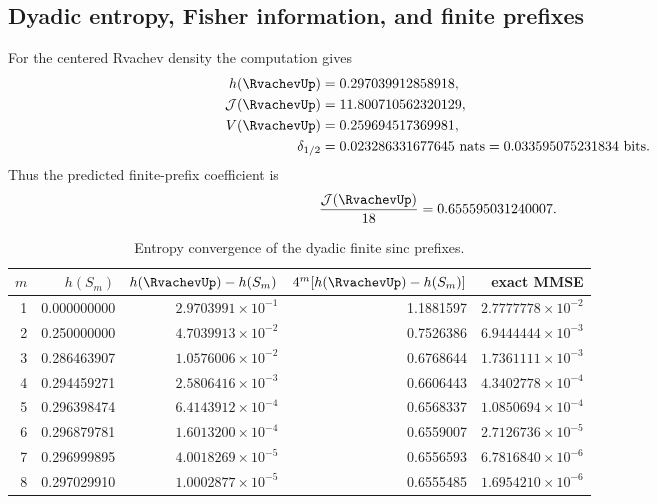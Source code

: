 \documentclass[11pt,oneside]{article}
\theoremstyle{definition}
\theoremstyle{remark}
\begin{document}
\subsection{Dyadic entropy, Fisher information, and finite prefixes}

For the centered Rvachev density the computation gives
\begin{align}
 h(\RvachevUp)&=0.297039912858918,\label{eq:num-hup}\\
 \mathcal J(\RvachevUp)&=11.800710562320129,\label{eq:num-Jup}\\
 V(\RvachevUp)&=0.259694517369981,\label{eq:num-Vup}\\
 \delta_{1/2}&=0.023286331677645\ \text{nats}
 =0.033595075231834\ \text{bits}.
 \label{eq:num-deficit-up}
\end{align}
Thus the predicted finite-prefix coefficient is
\begin{equation}
 \frac{\mathcal J(\RvachevUp)}{18}=0.655595031240007.
 \label{eq:num-prefix-coeff}
\end{equation}

\begin{table}[H]
\centering
\caption{Entropy convergence of the dyadic finite sinc prefixes.}
\label{tab:prefix-entropy}
\small
\begin{tabular}{@{}rrrrr@{}}
\toprule
$m$ & $h(S_m)$ & $h(\RvachevUp)-h(S_m)$ & $4^m[h(\RvachevUp)-h(S_m)]$ & exact MMSE\\
\midrule
1 & 0.000000000 & $2.9703991\!\times10^{-1}$ & 1.1881597 & $2.7777778\!\times10^{-2}$\\
2 & 0.250000000 & $4.7039913\!\times10^{-2}$ & 0.7526386 & $6.9444444\!\times10^{-3}$\\
3 & 0.286463907 & $1.0576006\!\times10^{-2}$ & 0.6768644 & $1.7361111\!\times10^{-3}$\\
4 & 0.294459271 & $2.5806416\!\times10^{-3}$ & 0.6606443 & $4.3402778\!\times10^{-4}$\\
5 & 0.296398474 & $6.4143912\!\times10^{-4}$ & 0.6568337 & $1.0850694\!\times10^{-4}$\\
6 & 0.296879781 & $1.6013200\!\times10^{-4}$ & 0.6559007 & $2.7126736\!\times10^{-5}$\\
7 & 0.296999895 & $4.0018269\!\times10^{-5}$ & 0.6556593 & $6.7816840\!\times10^{-6}$\\
8 & 0.297029910 & $1.0002877\!\times10^{-5}$ & 0.6555485 & $1.6954210\!\times10^{-6}$\\
\bottomrule
\end{tabular}
\end{table}
\end{document}
